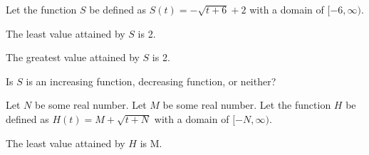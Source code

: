 \documentclass{ximera}
\begin{document}
\begin{definition}
Let the function $S$ be defined as $S(t) = -\sqrt{t+6}+2$ with a domain of $[-6, \infty)$. 

\end{definition}



\begin{exercise}
The least value attained by $S$ is 2.

\begin{multipleChoice}
\end{multipleChoice}

\end{exercise}



\begin{exercise}
The greatest value attained by $S$ is 2.

\begin{multipleChoice}
\end{multipleChoice}

\end{exercise}






\begin{exercise}
Is $S$ is an increasing function, decreasing function, or neither?

\begin{multipleChoice}
\end{multipleChoice}

\end{exercise}











\begin{definition}
Let $N$ be some real number.
Let $M$ be some real number.
Let the function $H$ be defined as $H(t) = M + \sqrt{t+N}$ with a domain of $[-N, \infty)$. 

\end{definition}


\begin{exercise}
The least value attained by $H$ is M.

\begin{multipleChoice}
\end{multipleChoice}

\end{exercise}
\end{document}
